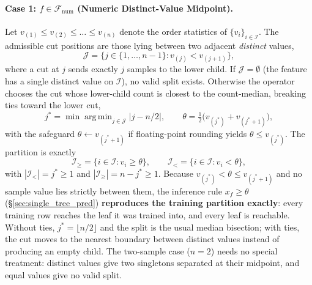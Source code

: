 \documentclass[11pt,a4paper]{article}
\DeclareMathOperator*{\argmin}{arg\,min}
\begin{document}
\paragraph{Case 1: $f \in \mathcal{F}_{\text{num}}$ (Numeric Distinct-Value Midpoint).}
Let $v_{(1)} \le v_{(2)} \le \dots \le v_{(n)}$ denote the order statistics of $\{v_i\}_{i \in \mathcal{I}}$. The admissible cut positions are those lying between two adjacent \emph{distinct} values,
\begin{equation}
  \mathcal{J} = \big\{ j \in \{1, \dots, n-1\} : v_{(j)} < v_{(j+1)} \big\},
\end{equation}
where a cut at $j$ sends exactly $j$ samples to the lower child. If $\mathcal{J} = \emptyset$ (the feature has a single distinct value on $\mathcal{I}$), no valid split exists. Otherwise the operator chooses the cut whose lower-child count is closest to the count-median, breaking ties toward the lower cut,
\begin{equation}
  j^{\ast} = \min \argmin_{j \in \mathcal{J}} \big| j - n/2 \big|,
  \qquad
  \theta = \tfrac{1}{2}\big(v_{(j^{\ast})} + v_{(j^{\ast}+1)}\big),
\end{equation}
with the safeguard $\theta \gets v_{(j^{\ast}+1)}$ if floating-point rounding yields $\theta \le v_{(j^{\ast})}$. The partition is exactly
\begin{equation}
  \mathcal{I}_{\ge} = \{i \in \mathcal{I} : v_i \ge \theta\},
  \qquad
  \mathcal{I}_{<} = \{i \in \mathcal{I} : v_i < \theta\},
\end{equation}
with $|\mathcal{I}_{<}| = j^{\ast} \ge 1$ and $|\mathcal{I}_{\ge}| = n - j^{\ast} \ge 1$. Because $v_{(j^{\ast})} < \theta \le v_{(j^{\ast}+1)}$ and no sample value lies strictly between them, the inference rule $x_f \ge \theta$ (\S\ref{sec:single_tree_pred}) \textbf{reproduces the training partition exactly}: every training row reaches the leaf it was trained into, and every leaf is reachable. Without ties, $j^{\ast} = \lfloor n/2 \rfloor$ and the split is the usual median bisection; with ties, the cut moves to the nearest boundary between distinct values instead of producing an empty child. The two-sample case ($n = 2$) needs no special treatment: distinct values give two singletons separated at their midpoint, and equal values give no valid split.
\end{document}
